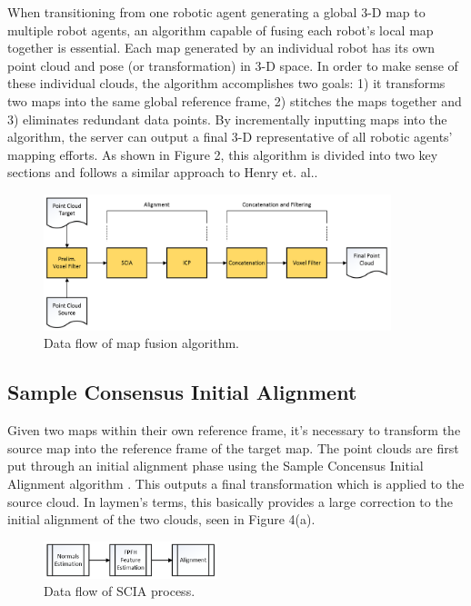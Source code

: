 \documentclass[letterpaper, oneside, 10pt]{report}
\begin{document}
\noindent When transitioning from one robotic agent generating a global 3-D map to multiple robot agents, an algorithm capable of fusing each robot's local map together is essential. Each map generated by an individual robot has its own point cloud and pose (or transformation) in 3-D space. In order to make sense of these individual clouds, the algorithm accomplishes two goals: 1) it transforms two maps into the same global reference frame, 2) stitches the maps together and 3) eliminates redundant data points. By incrementally inputting maps into the algorithm, the server can output a final 3-D representative of all robotic agents' mapping efforts. As shown in Figure 2, this algorithm is divided into two key sections and follows a similar approach to Henry et. al.\cite{henry2012rgb}.

\begin{figure}[h]
 \caption{Data flow of map fusion algorithm.}
 \centering
   \includegraphics[width=0.9\textwidth]{images/mapfusion}
\end{figure}

\subsection{Sample Consensus Initial Alignment}

\noindent Given two maps within their own reference frame, it's necessary to transform the source map into the reference frame of the target map. The point clouds are first put through an initial alignment phase using the Sample Concensus Initial Alignment algorithm \cite{rusu2009fast}. This outputs a final transformation which is applied to the source cloud. In laymen's terms, this basically provides a large correction to the initial alignment of the two clouds, seen in Figure 4(a).

\begin{figure}[h]
 \caption{Data flow of SCIA process.}
 \centering
   \includegraphics[width=0.45\textwidth]{images/initialalignment}
\end{figure}
\end{document}
